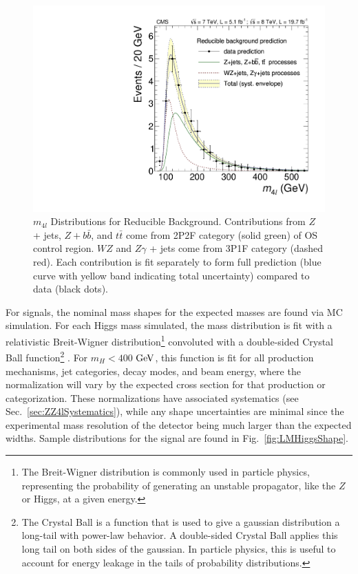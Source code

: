 \begin{figure}[htbp]
\begin{center}
\includegraphics[width=.6\linewidth]{HiggsDiscovery/figures/PredictedComponentsSR_withData_PAPER.pdf}
\caption[Reducible Background Mass Shapes]{$m_{4l}$ Distributions for Reducible Background. Contributions from $Z$ + jets, $Z+b\bar{b}$, and $t\bar{t}$ come from 2P2F category (solid green) of OS control region. $WZ$ and $Z\gamma$ + jets come from 3P1F category (dashed red). Each contribution is fit separately to form full prediction (blue curve with yellow band indicating total uncertainty) compared to data (black dots).}
\label{fig:ZXMassShapes}
\end{center}
\end{figure}

For signals, the nominal mass shapes for the expected masses are found via MC simulation. For each Higgs mass simulated, the mass distribution is fit with a relativistic Breit-Wigner distribution\footnote{The Breit-Wigner distribution is commonly used in particle physics, representing the probability of generating an unstable propagator, like the $Z$ or Higgs, at a given energy.} convoluted with a double-sided Crystal Ball function\footnote{The Crystal Ball is a function that is used to give a gaussian distribution a long-tail with power-law behavior. A double-sided Crystal Ball applies this long tail on both sides of the gaussian. In particle physics, this is useful to account for energy leakage in the tails of probability distributions.} \cite{CrystalBall}. For $m_H < 400$ $\rm{GeV}$, this function is fit for all production mechanisms, jet categories, decay modes, and beam energy, where the normalization will vary by the expected cross section for that production or categorization. These normalizations have associated systematics (see Sec.~\ref{sec:ZZ4lSystematics}), while any shape uncertainties are minimal since the experimental mass resolution of the detector being much larger than the expected widths. Sample distributions for the signal are found in Fig.~\ref{fig:LMHiggsShape}.

